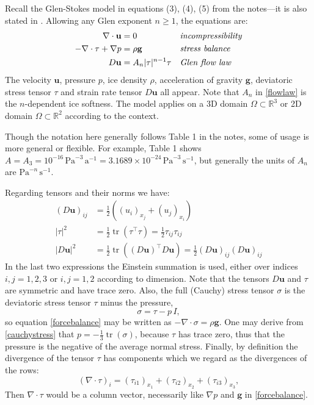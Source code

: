 \documentclass[letterpaper,final,12pt,reqno]{amsart}
\newcommand{\RR}{\mathbb{R}}
\newcommand{\Div}{\nabla\cdot}
\newcommand{\trace}{\operatorname{tr}}
\newcommand{\bg}{\mathbf{g}}
\newcommand{\bu}{\mathbf{u}}
\begin{document}
Recall the Glen-Stokes model in equations (3), (4), (5) from the notes---it is also stated in \cite{GreveBlatter2009,JouvetRappaz2011}.  Allowing any Glen exponent $n\ge 1$, the equations are:
\begin{align}
\nabla \cdot \bu &= 0 &&\text{\emph{incompressibility}} \label{incompressible} \\
- \nabla \cdot \tau + \nabla p &= \rho \bg &&\text{\emph{stress balance}} \label{forcebalance} \\
D\bu &= A_n |\tau|^{n-1} \tau &&\text{\emph{Glen flow law}} \label{flowlaw}
\end{align}
The velocity $\bu$, pressure $p$, ice density $\rho$, acceleration of gravity $\bg$, deviatoric stress tensor $\tau$ and strain rate tensor $D\bu$ all appear.  Note that $A_n$ in \eqref{flowlaw} is the $n$-dependent ice softness.  The model applies on a 3D domain $\Omega\subset \RR^3$ or 2D domain $\Omega \subset \RR^2$ according to the context.

Though the notation here generally follows Table 1 in the notes, some of usage is more general or flexible.  For example, Table 1 shows $A = A_3 = 10^{-16} \,\text{Pa}^{-3}\,\text{a}^{-1} = 3.1689 \times 10^{-24} \,\text{Pa}^{-3}\,\text{s}^{-1}$, but generally the units of $A_n$ are $\text{Pa}^{-n}\,\text{s}^{-1}$.

Regarding tensors and their norms we have:
\begin{align*}
(D\bu)_{ij} &= \frac{1}{2} \left((u_i)_{x_j} + (u_j)_{x_i}\right) \\
|\tau|^2 &= \frac{1}{2} \trace\left(\tau^\top \tau\right) = \frac{1}{2} \tau_{ij} \tau_{ij} \\
|D\bu|^2 &= \frac{1}{2} \trace\left((D\bu)^\top D\bu\right) = \frac{1}{2} (D\bu)_{ij} (D\bu)_{ij}
\end{align*}
In the last two expressions the Einstein summation is used, either over indices $i,j=1,2,3$ or $i,j=1,2$ according to dimension.  Note that the tensors $D\bu$ and $\tau$ are symmetric and have trace zero.  Also, the full (Cauchy) stress tensor $\sigma$ is the deviatoric stress tensor $\tau$ minus the pressure,
\begin{equation}
    \sigma = \tau - p\,I,  \label{cauchystress}
\end{equation}
so equation \eqref{forcebalance} may be written as $-\Div \sigma = \rho \bg$.  One may derive from \eqref{cauchystress} that $p = -\frac{1}{3} \trace(\sigma)$, because $\tau$ has trace zero, thus that the pressure is the negative of the average normal stress.  Finally, by definition the divergence of the tensor $\tau$ has components which we regard as the divergences of the rows:
    $$\left(\nabla \cdot \tau\right)_i = \left(\tau_{i1}\right)_{x_1} + \left(\tau_{i2}\right)_{x_2} + \left(\tau_{i3}\right)_{x_3},$$
Then $\nabla\cdot \tau$ would be a column vector, necessarily like $\nabla p$ and $\bg$ in \eqref{forcebalance}.
\end{document}
